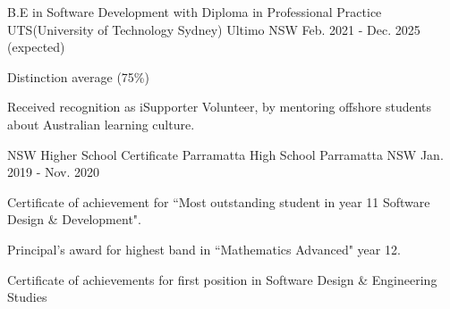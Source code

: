 

\begin{cventries}

  \cventry
    {B.E in Software Development with Diploma in Professional Practice} %
    {UTS(University of Technology Sydney)} %
    {Ultimo NSW} %
    {Feb. 2021 - Dec. 2025 (expected)} %
    {
      \begin{cvitems} %
      \item {Distinction average (75\%)}
        \item {Received recognition as iSupporter Volunteer, by mentoring offshore students about Australian learning culture.}
      \end{cvitems}
    }


\cventry
  {NSW Higher School Certificate} %
  {Parramatta High School} %
  {Parramatta NSW} %
  {Jan. 2019 - Nov. 2020} %
  {
    \begin{cvitems} %
    \item {Certificate of achievement for ``Most outstanding student in year 11 Software Design \& Development".}
    \item {Principal's award for highest band in ``Mathematics Advanced" year 12.}
    \item {Certificate of achievements for first position in Software Design \& Engineering Studies}
    \end{cvitems}
  }

\end{cventries}
